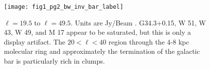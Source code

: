 \documentclass[12pt,preprint]{aastex}
\newcommand{\lon}{\ensuremath{\ell}}
\begin{document}
\addtocounter{figure}{-1}
\addtocounter{subfig}{1}

\begin{figure}
  \begin{minipage}{6.5in} 
    \begin{center}
      \texttt{[image: fig1\_pg2\_bw\_inv\_bar\_label]} 
      \caption{$\lon=19.5$ to $\lon=49.5$.  Units are Jy/Beam .  G34.3+0.15, W
	51, W 43, W 49, and M 17 appear to be saturated, but this is
	only a display artifact.  The $20 < \ell < 40$ region through the
        4-8 kpc molecular ring and approximately the termination of the galactic
        bar is particularly rich in clumps.}
    \end{center}
  \end{minipage}
\end{figure}

\addtocounter{figure}{-1}
\addtocounter{subfig}{1}
\end{document}

